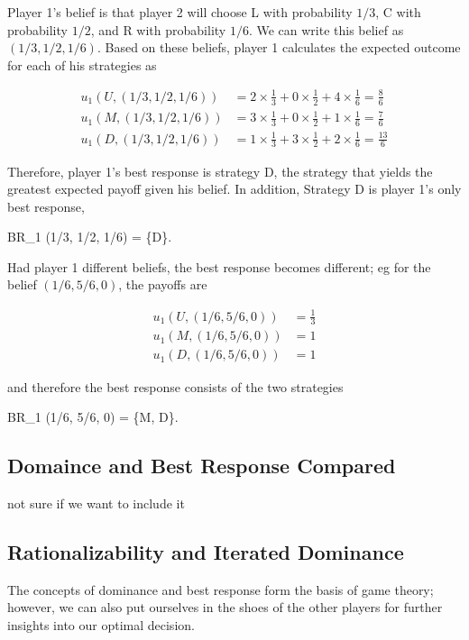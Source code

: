 Player 1's belief is that player 2 will choose L with probability $1/3$, C with probability $1/2$, and R with probability $1/6$. We can write this belief as $(1/3, 1/2, 1/6)$. Based on these beliefs, player 1 calculates the expected outcome for each of his strategies as

\begin{align*}
u_1(U, (1/3, 1/2, 1/6)) &= 2 \times \frac{1}{3} + 0 \times \frac{1}{2} + 4 \times \frac{1}{6} = \frac{8}{6} \\
u_1(M, (1/3, 1/2, 1/6)) &= 3 \times \frac{1}{3} + 0 \times \frac{1}{2} + 1 \times \frac{1}{6} = \frac{7}{6} \\
u_1(D, (1/3, 1/2, 1/6)) &= 1 \times \frac{1}{3} + 3 \times \frac{1}{2} + 2 \times \frac{1}{6} = \frac{13}{6}
\end{align*}

Therefore, player 1's best response is strategy D, the strategy that yields the greatest expected payoff given his belief. In addition, Strategy D is player 1's only best response,

\bee
BR_1 (1/3, 1/2, 1/6) = \{D\}.
\eee

Had player 1 different beliefs, the best response becomes different; eg for the belief $(1/6, 5/6, 0)$, the payoffs are

\begin{align*}
u_1(U, (1/6, 5/6, 0)) &= \frac{1}{3} \\
u_1(M, (1/6, 5/6, 0)) &= 1 \\
u_1(D, (1/6, 5/6, 0)) &= 1
\end{align*}

and therefore the best response consists of the two strategies

\bee
BR_1 (1/6, 5/6, 0) = \{M, D\}.
\eee


\subsection{Domaince and Best Response Compared}

not sure if we want to include it


 \subsection{Rationalizability and Iterated Dominance}
 
The concepts of dominance and best response form the basis of game theory; however, we can also put ourselves in the shoes of the other players for further insights into our optimal decision.

